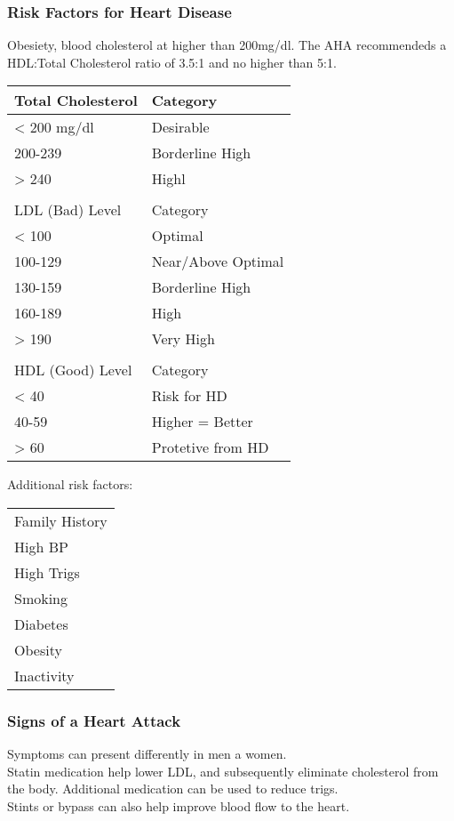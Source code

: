\documentclass[letterpaper, 11pt]{article}
\begin{document}
\subsubsection{Risk Factors for Heart Disease}
\label{sec:org261b306}
Obesiety, blood cholesterol at higher than 200mg/dl. The AHA recommendeds a HDL:Total Cholesterol ratio of 3.5:1 and no higher than 5:1.\\
\begin{center}
\begin{tabular}{ll}
Total Cholesterol & Category\\
\hline
< 200 mg/dl & Desirable\\
200-239 & Borderline High\\
> 240 & Highl\\
 & \\
LDL (Bad) Level & Category\\
\hline
< 100 & Optimal\\
100-129 & Near/Above Optimal\\
130-159 & Borderline High\\
160-189 & High\\
> 190 & Very High\\
 & \\
HDL (Good) Level & Category\\
\hline
< 40 & Risk for HD\\
40-59 & Higher = Better\\
> 60 & Protetive from HD\\
\end{tabular}
\end{center}
Additional risk factors:\\
\begin{center}
\begin{tabular}{l}
Family History\\
High BP\\
High Trigs\\
Smoking\\
Diabetes\\
Obesity\\
Inactivity\\
\end{tabular}
\end{center}
\subsubsection{Signs of a Heart Attack}
\label{sec:org39d4137}
Symptoms can present differently in men a women.\\
Statin medication help lower LDL, and subsequently eliminate cholesterol from the body. Additional medication can be used to reduce trigs.\\
Stints or bypass can also help improve blood flow to the heart.\\
\end{document}
